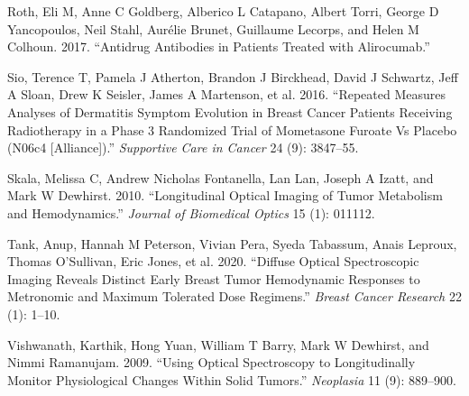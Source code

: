\documentclass[
]{article}
\begin{document}
\leavevmode\hypertarget{ref-roth2017}{}%
Roth, Eli M, Anne C Goldberg, Alberico L Catapano, Albert Torri, George
D Yancopoulos, Neil Stahl, Aurélie Brunet, Guillaume Lecorps, and Helen
M Colhoun. 2017. ``Antidrug Antibodies in Patients Treated with
Alirocumab.''

\leavevmode\hypertarget{ref-sio2016}{}%
Sio, Terence T, Pamela J Atherton, Brandon J Birckhead, David J
Schwartz, Jeff A Sloan, Drew K Seisler, James A Martenson, et al. 2016.
``Repeated Measures Analyses of Dermatitis Symptom Evolution in Breast
Cancer Patients Receiving Radiotherapy in a Phase 3 Randomized Trial of
Mometasone Furoate Vs Placebo (N06c4 {[}Alliance{]}).'' \emph{Supportive
Care in Cancer} 24 (9): 3847--55.

\leavevmode\hypertarget{ref-skala2010}{}%
Skala, Melissa C, Andrew Nicholas Fontanella, Lan Lan, Joseph A Izatt,
and Mark W Dewhirst. 2010. ``Longitudinal Optical Imaging of Tumor
Metabolism and Hemodynamics.'' \emph{Journal of Biomedical Optics} 15
(1): 011112.

\leavevmode\hypertarget{ref-tank2020}{}%
Tank, Anup, Hannah M Peterson, Vivian Pera, Syeda Tabassum, Anais
Leproux, Thomas O'Sullivan, Eric Jones, et al. 2020. ``Diffuse Optical
Spectroscopic Imaging Reveals Distinct Early Breast Tumor Hemodynamic
Responses to Metronomic and Maximum Tolerated Dose Regimens.''
\emph{Breast Cancer Research} 22 (1): 1--10.

\leavevmode\hypertarget{ref-vishwanath2009}{}%
Vishwanath, Karthik, Hong Yuan, William T Barry, Mark W Dewhirst, and
Nimmi Ramanujam. 2009. ``Using Optical Spectroscopy to Longitudinally
Monitor Physiological Changes Within Solid Tumors.'' \emph{Neoplasia} 11
(9): 889--900.
\end{document}
